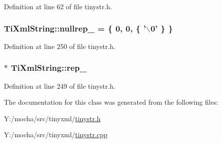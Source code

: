 Definition at line 62 of file tinystr.h.

\hypertarget{class_ti_xml_string_ae1f9e0de28328eed27d5623ff67a3191}{
\subsubsection[{nullrep\_\-}]{ {\bf TiXmlString::nullrep\_\-} = \{ 0, 0, \{ '$\backslash$0' \} \}}}
\label{class_ti_xml_string_ae1f9e0de28328eed27d5623ff67a3191}


Definition at line 250 of file tinystr.h.

\hypertarget{class_ti_xml_string_ac7be48f31ca451bcb16de428b5c40e0c}{
\subsubsection[{rep\_\-}]{$\ast$ {\bf TiXmlString::rep\_\-}}}
\label{class_ti_xml_string_ac7be48f31ca451bcb16de428b5c40e0c}


Definition at line 249 of file tinystr.h.



The documentation for this class was generated from the following files:\begin{DoxyCompactItemize}
\item 
Y:/mocha/src/tinyxml/\hyperlink{tinystr_8h}{tinystr.h}\item 
Y:/mocha/src/tinyxml/\hyperlink{tinystr_8cpp}{tinystr.cpp}\end{DoxyCompactItemize}
